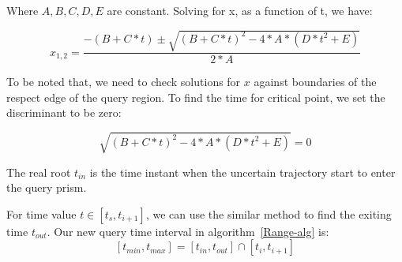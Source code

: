 Where $A,B,C,D,E$ are constant. Solving for x, as a function of t, we have:

$$x_{1,2}=\frac{-(B+C*t) \pm \sqrt{(B+C*t)^2-4*A*(D*t^2+E)}}{2*A}$$

To be noted that, we need to check solutions for $x$ against boundaries of the respect
edge of the query region. To find the time for critical point, we set the discriminant to
be zero:

$$\sqrt{(B+C*t)^2-4*A*(D*t^2+E)}=0$$

The real root $t_{in}$ is the time instant when the uncertain trajectory start to enter the query prism.

For time value $t \in [t_s, t_{i+1}]$, we can use the similar method to find the exiting time $t_{out}$. Our new
query time interval in algorithm~\ref{Range-alg} is:
$$[t_{min},t_{max}] = [t_{in},t_{out}] \cap [t_{i},t_{i+1}]$$